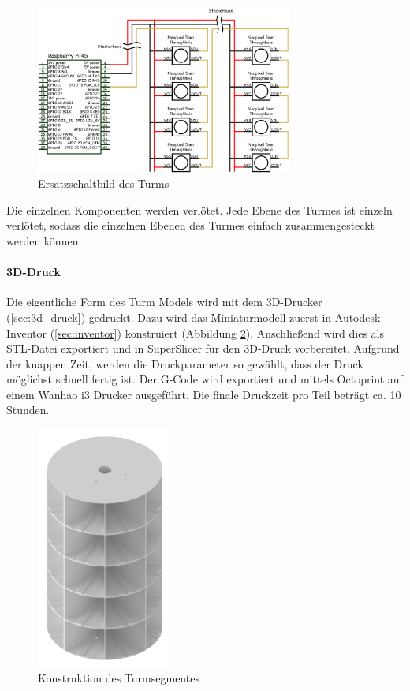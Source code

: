 \begin{figure}[H]
  \centering
  \includegraphics[width=0.75\textwidth]{images/tower_controller_v4_circuit_diagram.png}
  \caption{Ersatzschaltbild des Turms}
  \label{fig:ersatzschaltbild}
\end{figure}

Die einzelnen Komponenten werden verlötet. Jede Ebene des Turmes ist einzeln verlötet, sodass die einzelnen Ebenen des Turmes einfach zusammengesteckt werden können.

\clearpage

\paragraph{3D-Druck}

Die eigentliche Form des Turm Models wird mit dem 3D-Drucker (\ref{sec:3d_druck}) gedruckt. Dazu wird das Miniaturmodell zuerst in Autodesk Inventor (\ref{sec:inventor}) konstruiert (Abbildung \ref{fig:modell_konstruktion}). Anschließend wird dies als STL-Datei exportiert und in SuperSlicer für den 3D-Druck vorbereitet. Aufgrund der knappen Zeit, werden die Druckparameter so gewählt, dass der Druck möglichst schnell fertig ist. Der G-Code wird exportiert und mittels Octoprint auf einem Wanhao i3 Drucker ausgeführt. Die finale Druckzeit pro Teil beträgt ca. 10 Stunden.

\begin{figure}[H]
  \centering
  \includegraphics[width=0.4\textwidth]{images/turm_prototyp_konstruktion.png}
  \caption{Konstruktion des Turmsegmentes}
  \label{fig:modell_konstruktion}
\end{figure}

